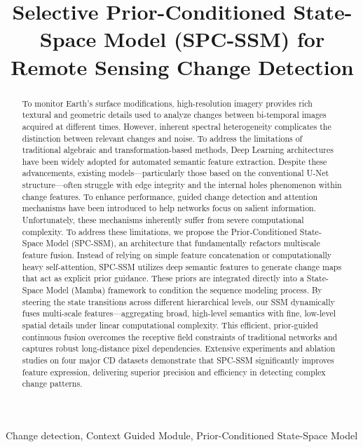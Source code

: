 \documentclass[10pt,conference]{IEEEtran}
\title{Selective Prior-Conditioned State-Space Model (SPC-SSM) for Remote Sensing Change Detection}
\author{
    \IEEEauthorblockN{
        Yosra Naceur\IEEEauthorrefmark{1}, 
        Mariem Zaouali\IEEEauthorrefmark{2}, 
        Sonia Bouzidi\IEEEauthorrefmark{3}
    }
    \IEEEauthorblockA{
        \IEEEauthorrefmark{1}Affiliation of Yosra Naceur\\
        \IEEEauthorrefmark{2}Affiliation of Mariem Zaouali\\
        \IEEEauthorrefmark{3}Affiliation of Sonia Bouzidi
    }
}
\begin{document}
\maketitle

\begin{abstract}
 To monitor Earth's surface modifications, high-resolution imagery provides rich textural and geometric details used to analyze changes between bi-temporal images acquired at different times. However, inherent spectral heterogeneity complicates the distinction between relevant changes and noise. To address the limitations of traditional algebraic and transformation-based methods, Deep Learning architectures have been widely adopted for automated semantic feature extraction. Despite these advancements, existing models—particularly those based on the conventional U-Net structure—often struggle with edge integrity and the internal holes phenomenon within change features. To enhance performance, guided change detection and attention mechanisms have been introduced to help networks focus on salient information. Unfortunately, these mechanisms inherently suffer from severe computational complexity. To address these limitations, we propose the Prior-Conditioned State-Space Model (SPC-SSM), an architecture that fundamentally refactors multiscale feature fusion. Instead of relying on simple feature concatenation or computationally heavy self-attention, SPC-SSM utilizes deep semantic features to generate change maps that act as explicit prior guidance. These priors are integrated directly into a State-Space Model (Mamba) framework to condition the sequence modeling process. By steering the state transitions across different hierarchical levels, our SSM dynamically fuses multi-scale features—aggregating broad, high-level semantics with fine, low-level spatial details under linear computational complexity. This efficient, prior-guided continuous fusion overcomes the receptive field constraints of traditional networks and captures robust long-distance pixel dependencies. Extensive experiments and ablation studies on four major CD datasets demonstrate that SPC-SSM significantly improves feature expression, delivering superior precision and efficiency in detecting complex change patterns.
\end{abstract}

\begin{IEEEkeywords}
Change detection, Context Guided Module, Prior-Conditioned State-Space Model
\end{IEEEkeywords}
\end{document}
